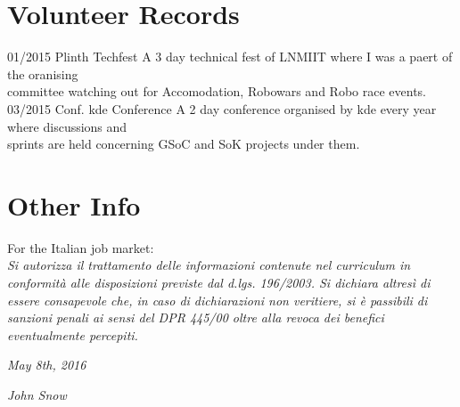 \documentclass[]{friggeri-cv}
\begin{document}
\section{Volunteer Records}
\begin{entrylist}
  \entry
    {01/2015}
    {Plinth}
    {Techfest}
    {A 3 day technical fest of LNMIIT where I was a paert of the oranising \\committee watching out for Accomodation, Robowars and Robo race events.\\}
  \entry
    {03/2015}
    {Conf. kde}
    {Conference}
    {A 2 day conference organised by kde every year where discussions and \\sprints are held concerning GSoC and SoK projects under them.\\}
\end{entrylist}


\section{Other Info}
For the Italian job market:\\
\emph{Si autorizza il trattamento delle informazioni contenute nel curriculum in conformità alle disposizioni previste dal d.lgs. 196/2003. Si dichiara altresì di essere consapevole che, in caso di dichiarazioni non veritiere, si è passibili di sanzioni penali ai sensi del DPR 445/00 oltre alla revoca dei benefici eventualmente percepiti.}
\\
\begin{flushleft}
\emph{May 8th, 2016}
\end{flushleft}
\begin{flushright}
\emph{John Snow}
\end{flushright}
\end{document}
